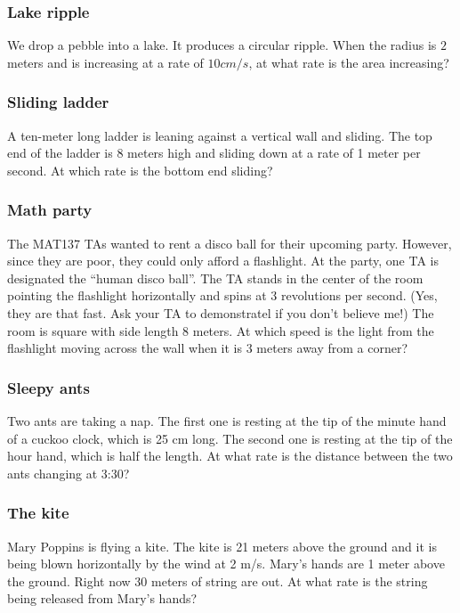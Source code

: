 \documentclass[14pt]{beamer}
\date{}
\title{}
\author{}
\begin{document}

\begin{frame}[t]
\frametitle{Lake ripple}

We drop a pebble into a lake.  It produces a circular ripple. When the radius is $2$ meters and is increasing at a rate of $10cm/s$, at what rate is the area increasing?

\end{frame}
\begin{frame}[t]
\frametitle{Sliding ladder}


 A ten-meter long ladder is leaning against a vertical wall and sliding.  The top end of the ladder is 8 meters high and sliding down at a rate of  1 meter per second.  At which rate is the bottom end sliding?

\end{frame}
\begin{frame}[t]
\frametitle{Math party}

The MAT137 TAs wanted to rent a disco ball for their upcoming party.  
However, since they are poor, they could only afford a flashlight.  At the party, one TA is designated the ``human disco ball''.
  The TA stands in the center of the room pointing the flashlight horizontally and spins at 3 revolutions per second.  
(Yes, they are that fast.  Ask your TA to demonstratel if you don't believe me!)  The room is square with side length 8 meters.  At which speed is the light from the flashlight moving across the wall when it is  3 meters away from a corner?
	
\end{frame}
\begin{frame}[t]
\frametitle{Sleepy ants}

Two ants are taking a nap.  The first one is resting at the tip of the minute hand of a cuckoo clock, which is 25 cm long.  The second one is resting at the tip of the hour hand, which is half the length.  At what rate is the distance between the two ants changing at 3:30?
	
\end{frame}
\begin{frame}[t]
\frametitle{The kite}

Mary Poppins is flying a kite.  The kite is 21 meters above the ground and it is being blown horizontally by the wind at 2 m/s.  Mary's hands are 1 meter above the ground.  Right now 30 meters of string are out.  At what rate is the string being released from Mary's hands?

\end{frame}
\end{document}
